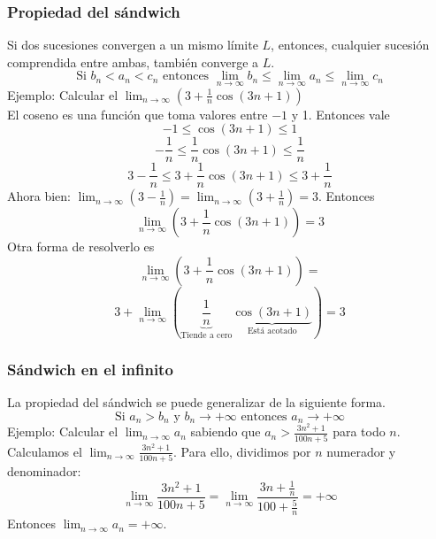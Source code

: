 \documentclass[../Teoría.root.tex]{subfiles}
\begin{document}
\subsubsection{Propiedad del sándwich}
Si dos sucesiones convergen a un mismo límite \(L\), entonces, cualquier sucesión comprendida entre ambas, también converge a \(L\).
\[\text{Si }b_n<a_n<c_n\text{ entonces }\lim_{n\to\infty}b_n\leq\lim_{n\to\infty}a_n\leq\lim_{n\to\infty}c_n\]
Ejemplo: Calcular el \(\lim_{n\to\infty}\left(3+\frac{1}{n}\cos(3n+1)\right)\)\\
El coseno es una función que toma valores entre \(-1\) y 1.
Entonces vale
\[-1\leq\cos(3n+1)\leq1\]
\[-\frac{1}{n}\leq\frac{1}{n}\cos(3n+1)\leq\frac{1}{n}\]
\[3-\frac{1}{n}\leq3+\frac{1}{n}\cos(3n+1)\leq3+\frac{1}{n}\]
Ahora bien: \(\lim_{n\to\infty}\left(3-\frac{1}{n}\right)=\lim_{n\to\infty}\left(3+\frac{1}{n}\right)=3\).
Entonces \[\lim_{n\to\infty}\left(3+\frac{1}{n}\cos(3n+1)\right)=3\]
Otra forma de resolverlo es
\[\lim_{n\to\infty}\left(3+\frac{1}{n}\cos(3n+1)\right)=\]
\[3+\lim_{n\to\infty}\left(\underbrace{\frac{1}{n}}_{\text{Tiende a cero}}\underbrace{\cos(3n+1)}_{\text{Está acotado}}\right)=3\]
\subsubsection{Sándwich en el infinito}
La propiedad del sándwich se puede generalizar de la siguiente forma.
\[\text{Si }a_n>b_n\text{ y }b_n\rightarrow+\infty\text{ entonces }a_n\rightarrow+\infty\]
Ejemplo: Calcular el \(\lim_{n\to\infty}a_n\) sabiendo que \(a_n>\frac{3n^2+1}{100n+5}\) para todo \(n\).\\
Calculamos el \(\lim_{n\to\infty}\frac{3n^2+1}{100n+5}\). Para ello, dividimos por \(n\) numerador y denominador:
\[\lim_{n\to\infty}\frac{3n^2+1}{100n+5}=\lim_{n\to\infty}\frac{3n+\frac{1}{n}}{100+\frac{5}{n}}=+\infty\]
Entonces \(\lim_{n\to\infty}a_n=+\infty\).
\end{document}
